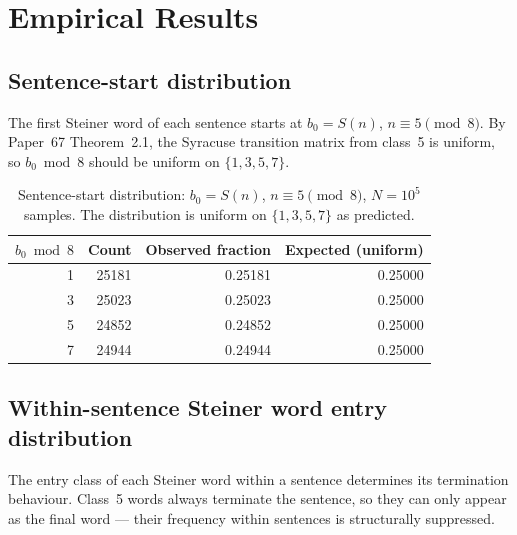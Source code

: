 \documentclass[12pt]{article}
\theoremstyle{definition}
\theoremstyle{remark}
\newcommand{\Sm}{S}
\begin{document}
\section{Empirical Results}
\label{sec:result}

\subsection{Sentence-start distribution}

The first Steiner word of each sentence starts at $b_0 = \Sm(n)$, $n \equiv 5\pmod{8}$.
By Paper~67 Theorem~2.1, the Syracuse transition matrix from class~5 is uniform,
so $b_0 \bmod 8$ should be uniform on $\{1,3,5,7\}$.

\begin{table}[h]
\centering
\begin{tabular}{rrrr}
\toprule
$b_0 \bmod 8$ & Count & Observed fraction & Expected (uniform) \\
\midrule
1 & 25181 & 0.25181 & 0.25000 \\
3 & 25023 & 0.25023 & 0.25000 \\
5 & 24852 & 0.24852 & 0.25000 \\
7 & 24944 & 0.24944 & 0.25000 \\
\bottomrule
\end{tabular}
\caption{Sentence-start distribution: $b_0 = \Sm(n)$, $n \equiv 5\pmod{8}$,
$N = 10^5$ samples. The distribution is uniform on $\{1,3,5,7\}$ as predicted.}
\label{tab:start}
\end{table}

\subsection{Within-sentence Steiner word entry distribution}

The entry class of each Steiner word within a sentence determines its termination
behaviour. Class~5 words always terminate the sentence, so they can only appear
as the final word — their frequency within sentences is structurally suppressed.
\end{document}
